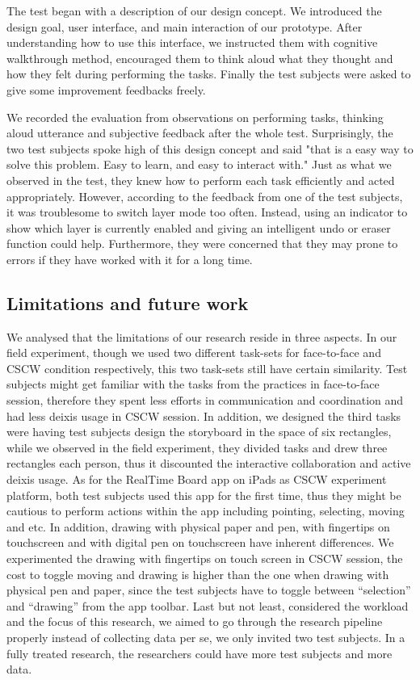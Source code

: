 \documentclass[12pt,twoside]{article}
\begin{document}
The test began with a description of our design concept. We introduced the design goal, user interface, and main interaction of our prototype. After understanding how to use this interface, we instructed them with cognitive walkthrough method, encouraged them to think aloud what they thought and how they felt during performing the tasks. Finally the test subjects were asked to give some improvement feedbacks freely.

We recorded the evaluation from observations on performing tasks, thinking aloud utterance and subjective feedback after the whole test. Surprisingly, the two test subjects spoke high of this design concept and said "that is a easy way to solve this problem. Easy to learn, and easy to interact with." Just as what we observed in the test, they knew how to perform each task efficiently and acted appropriately. However, according to the feedback from one of the test subjects, it was troublesome to switch layer mode too often. Instead, using an indicator to show which layer is currently enabled and giving an intelligent undo or eraser function could help. Furthermore, they were concerned that they may prone to errors if they have worked with it for a long time.    

\subsection{Limitations and future work}
\label{sec:limitations}
We analysed that the limitations of our research reside in three aspects. In our field experiment, though we used two different task-sets for face-to-face and CSCW condition respectively, this two task-sets still have certain similarity. Test subjects might get familiar with the tasks from the practices in face-to-face session, therefore they spent less efforts in communication and coordination and had less deixis usage in CSCW session. In addition, we designed the third tasks were having test subjects design the storyboard in the space of six rectangles, while we observed in the field experiment, they divided tasks and drew three rectangles each person, thus it discounted the interactive collaboration and active deixis usage. As for the RealTime Board app on iPads as CSCW experiment platform, both test subjects used this app for the first time, thus they might be cautious to perform actions within the app including pointing, selecting, moving and etc. In addition, drawing with physical paper and pen, with fingertips on touchscreen and with digital pen on touchscreen have inherent differences. We experimented the drawing with fingertips on touch screen in CSCW session, the cost to toggle moving and drawing is higher than the one when drawing with physical pen and paper, since the test subjects have to toggle between ``selection'' and ``drawing'' from the app toolbar. Last but not least, considered the workload and the focus of this research, we aimed to go through the research pipeline properly instead of collecting data per se, we only invited two test subjects. In a fully treated research, the researchers could have more test subjects and more data.
\end{document}
